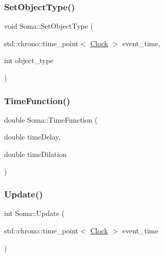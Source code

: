 \mbox{\label{classSoma_a85b4708eb51ab0962a6128b87aff0700}} 
\subsubsection{\texorpdfstring{Set\+Object\+Type()}{SetObjectType()}}
{\footnotesize\ttfamily void Soma\+::\+Set\+Object\+Type (\begin{DoxyParamCaption}\item[{std\+::chrono\+::time\+\_\+point$<$ \mbox{\hyperlink{universe_8h_a0ef8d951d1ca5ab3cfaf7ab4c7a6fd80}{Clock}} $>$}]{event\+\_\+time,  }\item[{int}]{object\+\_\+type }\end{DoxyParamCaption})}

\mbox{\label{classSoma_a926552007228732d39525ce127ee5a0d}} 
\subsubsection{\texorpdfstring{Time\+Function()}{TimeFunction()}}
{\footnotesize\ttfamily double Soma\+::\+Time\+Function (\begin{DoxyParamCaption}\item[{double}]{time\+Delay,  }\item[{double}]{time\+Dilation }\end{DoxyParamCaption})\hspace{0.3cm}{\ttfamily [inline]}}

\mbox{\label{classSoma_a211587ef21a7932c2f8f0345b1d32f57}} 
\subsubsection{\texorpdfstring{Update()}{Update()}}
{\footnotesize\ttfamily int Soma\+::\+Update (\begin{DoxyParamCaption}\item[{std\+::chrono\+::time\+\_\+point$<$ \mbox{\hyperlink{universe_8h_a0ef8d951d1ca5ab3cfaf7ab4c7a6fd80}{Clock}} $>$}]{event\+\_\+time }\end{DoxyParamCaption})}



